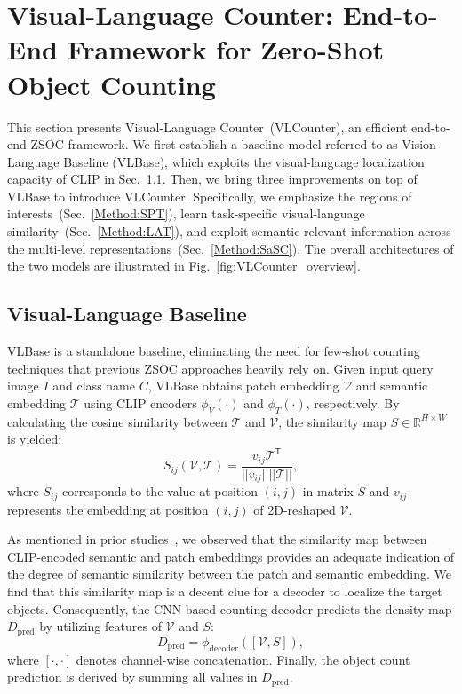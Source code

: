 \section{Visual-Language Counter: End-to-End Framework for Zero-Shot Object Counting}
This section presents Visual-Language Counter~(VLCounter), an efficient end-to-end ZSOC framework.
We first establish a baseline model referred to as Vision-Language Baseline (VLBase), which exploits the visual-language localization capacity of CLIP in Sec.~\ref{Method:VLBase}.
Then, we bring three improvements on top of VLBase to introduce VLCounter.
Specifically, we emphasize the regions of interests~(Sec.~\ref{Method:SPT}), learn task-specific visual-language similarity~(Sec.~\ref{Method:LAT}), and exploit semantic-relevant information across the multi-level representations~(Sec.~\ref{Method:SaSC}).
The overall architectures of the two models are illustrated in Fig.~\ref{fig:VLCounter_overview}. 




\subsection{Visual-Language Baseline}
\label{Method:VLBase}
VLBase is a standalone baseline, eliminating the need for few-shot counting techniques that previous ZSOC approaches heavily rely on.
Given input query image $I$ and class name $C$, VLBase obtains patch embedding $\mathcal{V}$ and semantic embedding $\mathcal{T}$ using CLIP encoders $\phi_V(\cdot)$ and $\phi_T(\cdot)$, respectively.
By calculating the cosine similarity between $\mathcal{T}$ and $\mathcal{V}$, the similarity map $S\in \mathbb{R}^{H \times W}$ is yielded:
\begin{equation}
    S_{ij}(\mathcal{V},\mathcal{T}) = \frac{v_{ij}\mathcal{T}^\mathsf{T}}{||v_{ij}||||\mathcal{T}||},
\end{equation}
where $S_{ij}$ corresponds to the value at position $(i,j)$ in matrix $S$ and $v_{ij}$ represents the embedding at position $(i, j)$ of 2D-reshaped $\mathcal{V}$.



As mentioned in prior studies~\cite{2022maskclip, li2023clipsurgery}, we observed that the similarity map between CLIP-encoded semantic and patch embeddings provides an adequate indication of the degree of semantic similarity between the patch and semantic embedding.
We find that this similarity map is a decent clue for a decoder to localize the target objects.
Consequently, the CNN-based counting decoder predicts the density map $D_\text{pred}$ by utilizing features of $\mathcal{V}$ and $S$:
\begin{equation}
\label{eq3}
    D_\text{pred} = \phi_\text{decoder}([\mathcal{V}, S]),
\end{equation}
where $[\cdot,\cdot]$ denotes channel-wise concatenation.
Finally, the object count prediction is derived by summing all values in $D_\text{pred}$.




